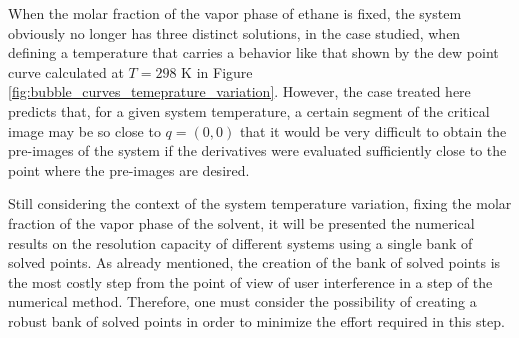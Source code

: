\documentclass[journal=iecred,manuscript=article]{achemso}
\theoremstyle{definition}
\theoremstyle{remark}
\begin{document}
When the molar fraction of the vapor phase of ethane is fixed, the system obviously no longer has three distinct solutions, in the case studied, when defining a temperature that carries a behavior like that shown by the dew point curve calculated at $ T = 298 $ K in Figure \ref{fig:bubble_curves_temeprature_variation}. However, the case treated here predicts that, for a given system temperature, a certain segment of the critical image may be so close to $ q = \left(0, 0\right) $ that it would be very difficult to obtain the pre-images of the system if the derivatives were evaluated sufficiently close to the point where the pre-images are desired.

Still considering the context of the system temperature variation, fixing the molar fraction of the vapor phase of the solvent, it will be presented the numerical results on the resolution capacity of different systems using a single bank of solved points. As already mentioned, the creation of the bank of solved points is the most costly step from the point of view of user interference in a step of the numerical method. Therefore, one must consider the possibility of creating a robust bank of solved points in order to minimize the effort required in this step.
\end{document}
